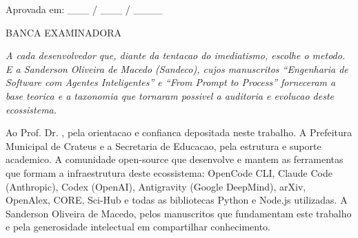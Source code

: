 \documentclass[12pt,a4paper,oneside,sumario=tradicional,chapter=TITLE,section=TITLE,subsection=TITLE,english,brazil]{abntex2}
\renewcommand{\ABNTEXchapterfont}{\bfseries}\renewcommand{\ABNTEXchapterfontsize}{\normalsize}
\begin{document}
\begin{folhadeaprovacao}\begin{center}{\ABNTEXchapterfont\large\imprimirautor}\vspace*{\fill}\vspace*{\fill}
\begin{center}\ABNTEXchapterfont\bfseries\Large\imprimirtitulo\end{center}\vspace*{\fill}
\hspace{.45\textwidth}\begin{minipage}{.5\textwidth}\imprimirpreambulo\end{minipage}\vspace*{\fill}
\begin{flushleft}Aprovada em: \_\_\_ / \_\_\_ / \_\_\_\_\end{flushleft}
\begin{center}BANCA EXAMINADORA\end{center}\vspace{1cm}
\smallskip
\end{center}\end{folhadeaprovacao}
\begin{dedicatoria}\vspace*{\fill}\centering\noindent
\textit{A cada desenvolvedor que, diante da tentacao do imediatismo, escolhe o metodo. E a Sanderson Oliveira de Macedo (Sandeco), cujos manuscritos ``Engenharia de Software com Agentes Inteligentes'' e ``From Prompt to Process'' forneceram a base teorica e a taxonomia que tornaram possivel a auditoria e evolucao deste ecossistema.}\vspace*{\fill}\end{dedicatoria}
\begin{agradecimentos}
Ao Prof. Dr. \imprimirorientador, pela orientacao e confianca depositada neste trabalho. A Prefeitura Municipal de Crateus e a Secretaria de Educacao, pela estrutura e suporte academico. A comunidade open-source que desenvolve e mantem as ferramentas que formam a infraestrutura deste ecossistema: OpenCode CLI, Claude Code (Anthropic), Codex (OpenAI), Antigravity (Google DeepMind), arXiv, OpenAlex, CORE, Sci-Hub e todas as bibliotecas Python e Node.js utilizadas. A Sanderson Oliveira de Macedo, pelos manuscritos que fundamentam este trabalho e pela generosidade intelectual em compartilhar conhecimento.
\end{agradecimentos}
\end{document}
